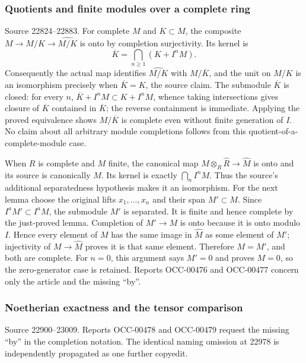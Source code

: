 \subsubsection{Quotients and finite modules over a complete ring}\label{algebra-proof-014-quotients-and-finite-modules-over-a-complete-ring}

Source 22824--22883. For complete \(M\) and \(K\subset M\), the composite \(M\to M/K\to\widehat{M/K}\) is onto by completion surjectivity. Its kernel is \[
\overline K=\bigcap_{n\geq1}(K+I^nM).
\] Consequently the actual map identifies \(\widehat{M/K}\) with \(M/\overline K\), and the unit on \(M/K\) is an isomorphism precisely when \(\overline K=K\), the source claim. The submodule \(\overline K\) is closed: for every \(n\), \(\overline K+I^nM\subset K+I^nM\), whence taking intersections gives closure of \(\overline K\) contained in \(\overline K\); the reverse containment is immediate. Applying the proved equivalence shows \(M/\overline K\) is complete even without finite generation of \(I\). No claim about all arbitrary module completions follows from this quotient-of-a-complete-module case.

When \(R\) is complete and \(M\) finite, the canonical map \(M\otimes_R\widehat R\to\widehat M\) is onto and its source is canonically \(M\). Its kernel is exactly \(\bigcap_n I^nM\). Thus the source's additional separatedness hypothesis makes it an isomorphism. For the next lemma choose the original lifts \(x_1,\ldots,x_n\) and their span \(M'\subset M\). Since \(I^aM'\subset I^aM\), the submodule \(M'\) is separated. It is finite and hence complete by the just-proved lemma. Completion of \(M'\to M\) is onto because it is onto modulo \(I\). Hence every element of \(M\) has the same image in \(\widehat M\) as some element of \(M'\); injectivity of \(M\to\widehat M\) proves it is that same element. Therefore \(M=M'\), and both are complete. For \(n=0\), this argument says \(M'=0\) and proves \(M=0\), so the zero-generator case is retained. Reports OCC-00476 and OCC-00477 concern only the article and the missing ``by''.

\subsubsection{Noetherian exactness and the tensor comparison}\label{algebra-proof-014-noetherian-exactness-and-the-tensor-comparison}

Source 22900--23009. Reports OCC-00478 and OCC-00479 request the missing ``by'' in the completion notation. The identical naming omission at 22978 is independently propagated as one further copyedit.

